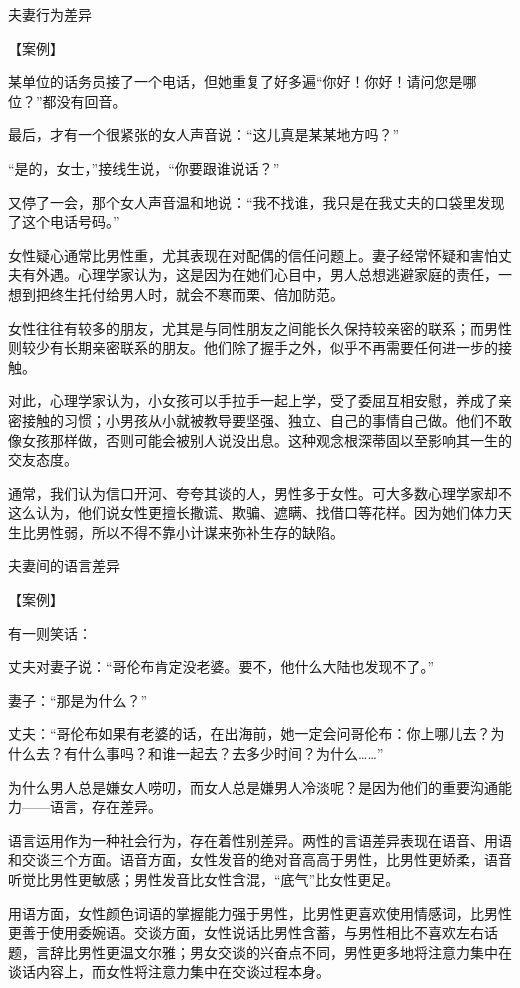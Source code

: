\documentclass[12pt,UTF8,openany]{ctexbook}
\begin{document}
夫妻行为差异


【案例】

某单位的话务员接了一个电话，但她重复了好多遍“你好！你好！请问您是哪位？”都没有回音。

最后，才有一个很紧张的女人声音说：“这儿真是某某地方吗？”

“是的，女士，”接线生说，“你要跟谁说话？”

又停了一会，那个女人声音温和地说：“我不找谁，我只是在我丈夫的口袋里发现了这个电话号码。”

女性疑心通常比男性重，尤其表现在对配偶的信任问题上。妻子经常怀疑和害怕丈夫有外遇。心理学家认为，这是因为在她们心目中，男人总想逃避家庭的责任，一想到把终生托付给男人时，就会不寒而栗、倍加防范。

女性往往有较多的朋友，尤其是与同性朋友之间能长久保持较亲密的联系；而男性则较少有长期亲密联系的朋友。他们除了握手之外，似乎不再需要任何进一步的接触。

对此，心理学家认为，小女孩可以手拉手一起上学，受了委屈互相安慰，养成了亲密接触的习惯；小男孩从小就被教导要坚强、独立、自己的事情自己做。他们不敢像女孩那样做，否则可能会被别人说没出息。这种观念根深蒂固以至影响其一生的交友态度。

通常，我们认为信口开河、夸夸其谈的人，男性多于女性。可大多数心理学家却不这么认为，他们说女性更擅长撒谎、欺骗、遮瞒、找借口等花样。因为她们体力天生比男性弱，所以不得不靠小计谋来弥补生存的缺陷。





夫妻间的语言差异


【案例】

有一则笑话：

丈夫对妻子说：“哥伦布肯定没老婆。要不，他什么大陆也发现不了。”

妻子：“那是为什么？”

丈夫：“哥伦布如果有老婆的话，在出海前，她一定会问哥伦布：你上哪儿去？为什么去？有什么事吗？和谁一起去？去多少时间？为什么……”

为什么男人总是嫌女人唠叨，而女人总是嫌男人冷淡呢？是因为他们的重要沟通能力——语言，存在差异。

语言运用作为一种社会行为，存在着性别差异。两性的言语差异表现在语音、用语和交谈三个方面。语音方面，女性发音的绝对音高高于男性，比男性更娇柔，语音听觉比男性更敏感；男性发音比女性含混，“底气”比女性更足。

用语方面，女性颜色词语的掌握能力强于男性，比男性更喜欢使用情感词，比男性更善于使用委婉语。交谈方面，女性说话比男性含蓄，与男性相比不喜欢左右话题，言辞比男性更温文尔雅；男女交谈的兴奋点不同，男性更多地将注意力集中在谈话内容上，而女性将注意力集中在交谈过程本身。
\end{document}
